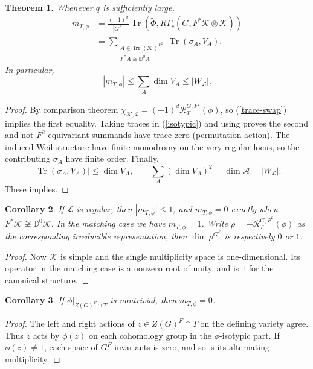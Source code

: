 \documentclass[11pt,letterpaper]{amsart}
\newtheorem{theorem}{Theorem}
\newtheorem{corollary}[theorem]{Corollary}
\theoremstyle{definition}
\numberwithin{equation}{section}
\numberwithin{theorem}{section}
\begin{document}
\begin{theorem}\label{subfield-trace}
Whenever $q$ is sufficiently large,
\begin{equation*}
\begin{aligned}
 m_{T,\phi}
 &=\frac{(-1)^d}{|G^F|}
   \operatorname{Tr}(\widetilde\Phi,
                  R\Gamma_c(G,F^*\mathcal K\otimes\mathcal K))\\
 &=\sum_{\substack{A\in\operatorname{Irr}(\mathcal K)^{F^2}\\
                      F^*A\cong\mathbb D^0A}}
                      \operatorname{Tr}(\sigma_A,V_A).
\end{aligned}
\end{equation*}
In particular,
\begin{equation*}
 |m_{T,\phi}|\leq\sum_A\dim V_A
                 \leq |W_{\mathcal L}|.
\end{equation*}
\end{theorem}
\begin{proof}
By comparison theorem $\chi_{\mathcal K,\Phi}=(-1)^d\mathcal R_T^{G,F^2}(\phi)$,
so (\ref{trace-swap}) implies the first equality. Taking traces in
(\ref{isotypic}) and using  proves the second and 
not $F^2$-equivariant summands have trace zero (permutation action).
The induced Weil structure have finite monodromy on the very regular locus, so the contributing
$\sigma_A$ have finite order. Finally,
\[
 |\operatorname{Tr}(\sigma_A,V_A)|\leq\dim V_A,\qquad
 \sum_A(\dim V_A)^2=\dim\mathscr A=|W_{\mathcal L}|.
\]
These implies.
\end{proof}

\begin{corollary}\label{regular-F2}
If $\mathcal L$ is regular, then $|m_{T,\phi}|\leq1$, and
$m_{T,\phi}=0$ exactly when
$F^*\mathcal K\not\cong\mathbb D^0\mathcal K$.
In the matching case we have $m_{T,\phi}=1$.
Write $\rho=\pm\mathcal R_T^{G,F^2}(\phi)$ as the corresponding irreducible
representation, then $\dim\rho^{G^F}$ is respectively $0$ or $1$.
\end{corollary}
\begin{proof}
Now $\mathcal K$ is simple and the single multiplicity space is
one-dimensional. Its operator in the matching case is a nonzero
root of unity, and is $1$ for the canonical structure.
\end{proof}

\begin{corollary}\label{central-obstruction}
If $\phi|_{Z(G)^F\cap T}$ is nontrivial, then $m_{T,\phi}=0$.
\end{corollary}
\begin{proof}
The left and right actions of $z\in Z(G)^F\cap T$ on the defining
variety agree. Thus $z$ acts by $\phi(z)$ on each cohomology group
in the $\phi$-isotypic part. If $\phi(z)\ne1$, each space of
$G^F$-invariants is zero, and so is its alternating multiplicity.
\end{proof}


{}

\end{document}
